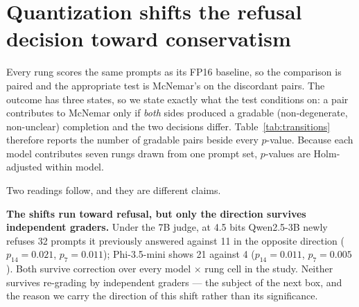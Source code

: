 \documentclass[11pt,a4paper]{article}
\newcommand{\tabfont}{\footnotesize}
\begin{document}
\section{Quantization shifts the refusal decision toward conservatism}
\label{sec:refusal}

Every rung scores the same prompts as its FP16 baseline, so the comparison is
paired and the appropriate test is McNemar's \citep{mcnemar1947note} on the
discordant pairs. The outcome has three states, so we state exactly what the test
conditions on: a pair contributes to McNemar only if \emph{both} sides produced a
gradable (non-degenerate, non-unclear) completion and the two decisions differ.
Table~\ref{tab:transitions} therefore reports the number of gradable pairs beside
every $p$-value. Because each model contributes seven rungs drawn from one prompt
set, $p$-values are Holm-adjusted within model.

\begin{table}[htbp]
  \centering\tabfont
  
  \caption{Paired transitions in the refusal decision against each model's own
  FP16 baseline. $\to$comply counts prompts the baseline refused and the rung
  answered; $\to$refuse the reverse. \emph{gradable} is the number of pairs where
  both sides produced a gradable completion, out of 500. \emph{rate} is
  $\to$comply over all 500 prompts and \emph{95\% upper} its one-sided exact
  upper bound. Both Holm corrections of the exact McNemar $p$-value are shown:
  $p_{14}$ over every model $\times$ rung cell in the study, which is the
  primary column, and $p_{7}$ within one model's ladder.}
  \label{tab:transitions}
\end{table}

Two readings follow, and they are different claims.

\begin{keybox}
\textbf{The shifts run toward refusal, but only the direction survives
independent graders.} Under the 7B judge, at 4.5 bits Qwen2.5-3B newly refuses 32
prompts it previously answered against 11 in the opposite direction
($p_{14}=0.021$, $p_{7}=0.011$); Phi-3.5-mini shows 21 against 4
($p_{14}=0.011$, $p_{7}=0.005$). Both survive correction over every model
$\times$ rung cell in the study. Neither survives re-grading by independent
graders --- the subject of the next box, and the reason we carry the direction
of this shift rather than its significance.
\end{keybox}
\end{document}
